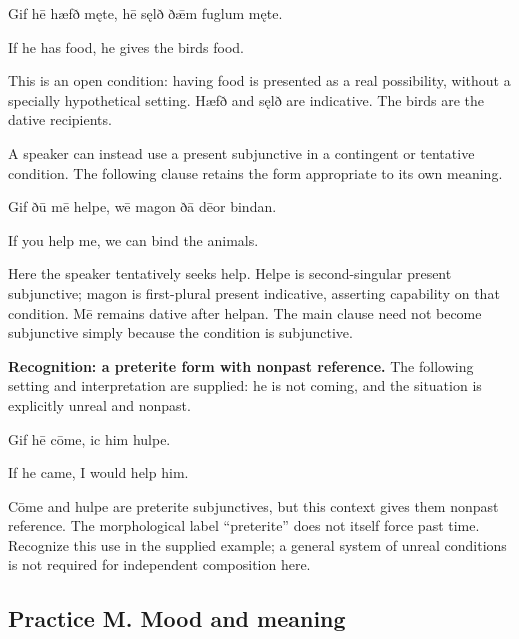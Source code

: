 Gif hē hæfð męte, hē sęlð ðǣm fuglum męte.

If he has food, he gives the birds food.

This is an open condition: having food is presented as a real possibility, without a specially hypothetical setting. Hæfð and sęlð are indicative. The birds are the dative recipients.

A speaker can instead use a present subjunctive in a contingent or tentative condition. The following clause retains the form appropriate to its own meaning.

Gif ðū mē helpe, wē magon ðā dēor bindan.

If you help me, we can bind the animals.

Here the speaker tentatively seeks help. Helpe is second-singular present subjunctive; magon is first-plural present indicative, asserting capability on that condition. Mē remains dative after helpan. The main clause need not become subjunctive simply because the condition is subjunctive.

\textbf{Recognition: a preterite form with nonpast reference.} The following setting and interpretation are supplied: he is not coming, and the situation is explicitly unreal and nonpast.

Gif hē cōme, ic him hulpe.

If he came, I would help him.

Cōme and hulpe are preterite subjunctives, but this context gives them nonpast reference. The morphological label “preterite” does not itself force past time. Recognize this use in the supplied example; a general system of unreal conditions is not required for independent composition here.

\subsection*{Practice M. Mood and meaning}

